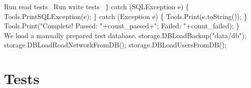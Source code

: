 \documentclass{article}
\def\nwendcode{\endtrivlist \endgroup}
\let\nwdocspar=\par
\begin{document}
    \LA{}Run read tests~{\nwtagstyle{}}\RA{}
    \LA{}Run write tests~{\nwtagstyle{}}\RA{}
  \} catch (SQLException e) \{
    Tools.PrintSQLException(e);
  \} catch (Exception e) \{
    Tools.Print(e.toString());
  \}
  Tools.Print("Complete! Passed: "+count_passed+"; Failed: "+count_failed);
\}
\eatline
{}\nwendcode{}We load a manually prepared test database.
\nwenddocs{}\endmoddef{}
storage.DBLoadBackup("data/db");
storage.DBLoadRoadNetworkFromDB();
storage.DBLoadUsersFromDB();
\nwendcode{}\nwdocspar
\section{Tests}
\label{sec:tests}
\end{document}
